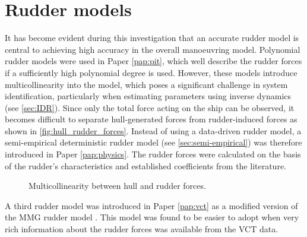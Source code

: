 \section{Rudder models} \label{sec:rudders}
It has become evident during this investigation that an accurate rudder model is central to achieving high accuracy in the overall manoeuvring model. Polynomial rudder models were used in Paper \ref{pap:pit}, which well describe the rudder forces if a sufficiently high polynomial degree is used. However, these models introduce multicollinearity into the model, which poses a significant challenge in system identification, particularly when estimating parameters using inverse dynamics  (see \autoref{sec:IDR}). Since only the total force acting on the ship can be observed, it becomes difficult to separate hull-generated forces from rudder-induced forces as shown in \autoref{fig:hull_rudder_forces}. Instead of using a data-driven rudder model, a semi-empirical deterministic rudder model (see \autoref{sec:semi-empirical}) was therefore introduced in Paper \ref{pap:physics}. The rudder forces were calculated on the basis of the rudder's characteristics and established coefficients from the literature.
\begin{figure}[h]
    \centering
    
    \caption{Multicollinearity between hull and rudder forces.}
    \label{fig:hull_rudder_forces}
\end{figure}
A third rudder model was introduced in Paper \ref{pap:vct} as a modified version of the MMG rudder model \cite{yasukawaIntroductionMMGStandard2015}. This model was found to be easier to adopt when very rich information about the rudder forces was available from the VCT data.


